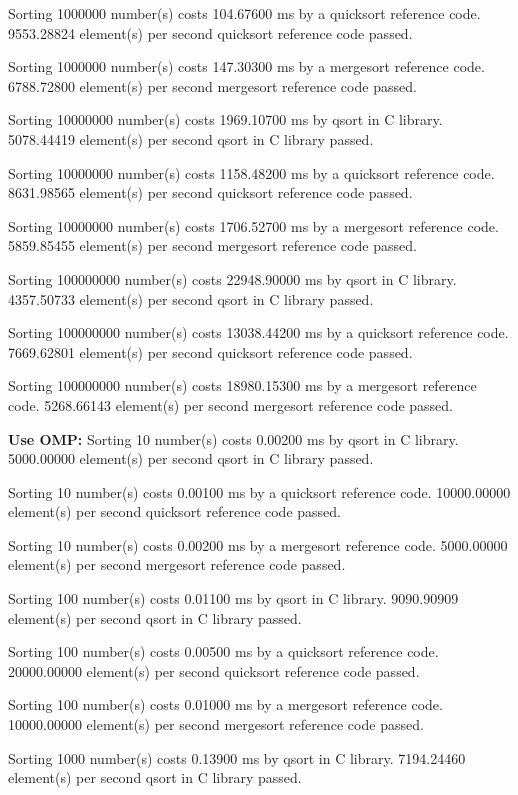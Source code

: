 \documentclass[12pt]{article}
\begin{document}
Sorting 1000000 number(s) costs 104.67600 ms by a quicksort reference code. 9553.28824 element(s) per second
quicksort reference code passed.

Sorting 1000000 number(s) costs 147.30300 ms by a mergesort reference code. 6788.72800 element(s) per second
mergesort reference code passed.

Sorting 10000000 number(s) costs 1969.10700 ms by qsort in C library. 5078.44419 element(s) per second
qsort in C library passed.

Sorting 10000000 number(s) costs 1158.48200 ms by a quicksort reference code. 8631.98565 element(s) per second
quicksort reference code passed.

Sorting 10000000 number(s) costs 1706.52700 ms by a mergesort reference code. 5859.85455 element(s) per second
mergesort reference code passed.

Sorting 100000000 number(s) costs 22948.90000 ms by qsort in C library. 4357.50733 element(s) per second
qsort in C library passed.

Sorting 100000000 number(s) costs 13038.44200 ms by a quicksort reference code. 7669.62801 element(s) per second
quicksort reference code passed.

Sorting 100000000 number(s) costs 18980.15300 ms by a mergesort reference code. 5268.66143 element(s) per second
mergesort reference code passed.


\textbf{Use OMP:}
Sorting 10 number(s) costs 0.00200 ms by qsort in C library. 5000.00000 element(s) per second
qsort in C library passed.

Sorting 10 number(s) costs 0.00100 ms by a quicksort reference code. 10000.00000 element(s) per second
quicksort reference code passed.

Sorting 10 number(s) costs 0.00200 ms by a mergesort reference code. 5000.00000 element(s) per second
mergesort reference code passed.

Sorting 100 number(s) costs 0.01100 ms by qsort in C library. 9090.90909 element(s) per second
qsort in C library passed.

Sorting 100 number(s) costs 0.00500 ms by a quicksort reference code. 20000.00000 element(s) per second
quicksort reference code passed.

Sorting 100 number(s) costs 0.01000 ms by a mergesort reference code. 10000.00000 element(s) per second
mergesort reference code passed.

Sorting 1000 number(s) costs 0.13900 ms by qsort in C library. 7194.24460 element(s) per second
qsort in C library passed.
\end{document}
